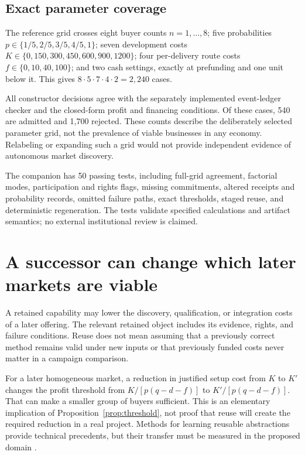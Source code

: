 \documentclass[11pt,letterpaper]{article}
\theoremstyle{remark}\newtheorem{remark}{Remark}[section]
\begin{document}
\subsection{Exact parameter coverage}
The reference grid crosses eight buyer counts $n=1,\ldots,8$; five probabilities $p\in\{1/5,2/5,3/5,4/5,1\}$; seven development costs $K\in\{0,150,300,450,600,900,1200\}$; four per-delivery route costs $f\in\{0,10,40,100\}$; and two cash settings, exactly at prefunding and one unit below it. This gives $8\cdot5\cdot7\cdot4\cdot2=2,240$ cases.

All constructor decisions agree with the separately implemented event-ledger checker and the closed-form profit and financing conditions. Of these cases, 540 are admitted and 1,700 rejected. These counts describe the deliberately selected parameter grid, not the prevalence of viable businesses in any economy. Relabeling or expanding such a grid would not provide independent evidence of autonomous market discovery.

The companion has 50 passing tests, including full-grid agreement, factorial modes, participation and rights flags, missing commitments, altered receipts and probability records, omitted failure paths, exact thresholds, staged reuse, and deterministic regeneration. The tests validate specified calculations and artifact semantics; no external institutional review is claimed.

\section{A successor can change which later markets are viable}
\label{sec:reuse}
A retained capability may lower the discovery, qualification, or integration costs of a later offering. The relevant retained object includes its evidence, rights, and failure conditions. Reuse does not mean assuming that a previously correct method remains valid under new inputs or that previously funded costs never matter in a campaign comparison.

For a later homogeneous market, a reduction in justified setup cost from $K$ to $K'$ changes the profit threshold from $K/[p(q-d-f)]$ to $K'/[p(q-d-f)]$. That can make a smaller group of buyers sufficient. This is an elementary implication of Proposition~\ref{prop:threshold}, not proof that reuse will create the required reduction in a real project. Methods for learning reusable abstractions provide technical precedents, but their transfer must be measured in the proposed domain \citep{ellis2020}.
\end{document}
